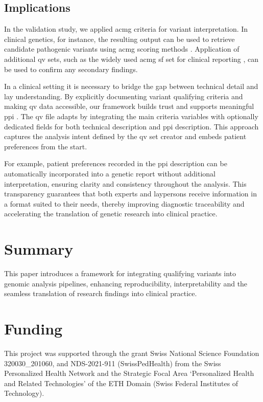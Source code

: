 \subsection{Implications}
In the validation study, we applied \ac{acmg} criteria for variant interpretation. In clinical genetics, for instance, the resulting output can be used to retrieve candidate pathogenic variants using \ac{acmg} scoring methods \cite{richards2015standards, tavtigian2020fitting}.
Application of additional \ac{qv} sets, such as the widely used \ac{acmg} \ac{sf} set for clinical reporting \cite{miller2023acmg}, can be used to confirm any secondary findings.

In a clinical setting it is necessary to bridge the gap between technical detail and lay understanding. By explicitly documenting variant qualifying criteria and making \ac{qv} data accessible, our framework builds trust and supports meaningful \ac{ppi} \cite{morris_answer_2011}. The \ac{qv} file adapts by integrating the main criteria variables with optionally dedicated fields for both technical description and \ac{ppi} description. This approach captures the analysis intent defined by the \ac{qv} set creator and embeds patient preferences from the start. 

For example, patient preferences recorded in the \ac{ppi} description can be automatically incorporated into a genetic report without additional interpretation, ensuring clarity and consistency throughout the analysis. This transparency guarantees that both experts and laypersons receive information in a format suited to their needs, thereby improving diagnostic traceability and accelerating the translation of genetic research into clinical practice.

\FloatBarrier

\section{Summary}
This paper introduces a framework for integrating qualifying variants into genomic analysis pipelines, enhancing reproducibility, interpretability and the seamless translation of research findings into clinical practice.

\section{Funding}
This project was supported through the grant Swiss National Science Foundation  320030\_201060, and NDS-2021-911 (SwissPedHealth) from the Swiss Personalized Health Network and the Strategic Focal Area `Personalized Health and Related Technologies' of the ETH Domain (Swiss Federal Institutes of Technology).

